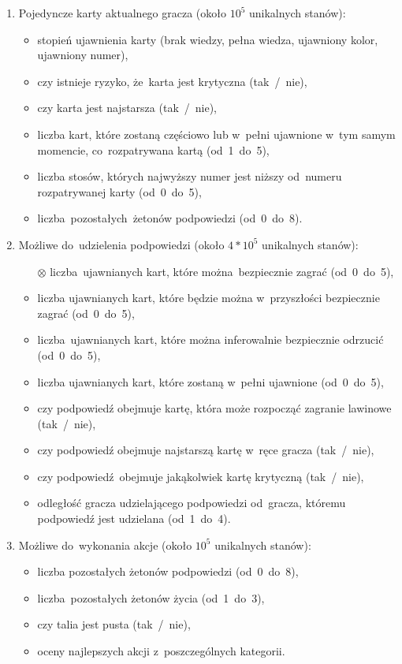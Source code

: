 \documentclass[declaration,shortabstract,inz]{iithesis}
\begin{document}
\begin{enumerate}
	\item Pojedyncze karty aktualnego gracza (około $10^5$ unikalnych stanów):
		\begin{itemize}
			\item stopień ujawnienia karty (brak wiedzy, pełna wiedza, ujawniony kolor, ujawniony numer),
			\item czy istnieje ryzyko, że~karta jest krytyczna (tak~/~nie),
			\item czy karta jest najstarsza (tak~/~nie),
			\item liczba kart, które zostaną częściowo lub w~pełni ujawnione w~tym samym momencie, co~rozpatrywana kartą (od~1~do~5),
			\item liczba stosów, których najwyższy numer jest niższy od~numeru rozpatrywanej karty (od~0~do~5),
			\item liczba pozostałych żetonów podpowiedzi (od~0~do~8).
		\end{itemize}
	\item Możliwe do~udzielenia podpowiedzi (około $4*10^5$ unikalnych stanów):
		\begin{itemize}
			\item[$\otimes$] liczba ujawnianych kart, które można bezpiecznie zagrać (od~0~do~5),
			\item liczba ujawnianych kart, które będzie można w~przyszłości bezpiecznie zagrać (od~0~do~5),
			\item liczba ujawnianych kart, które można inferowalnie bezpiecznie odrzucić (od~0~do~5),
			\item liczba ujawnianych kart, które zostaną w~pełni ujawnione (od~0~do~5),
			\item czy podpowiedź obejmuje kartę, która może rozpocząć zagranie lawinowe (tak~/~nie),
			\item czy podpowiedź obejmuje najstarszą kartę w~ręce gracza (tak~/~nie),
			\item czy podpowiedź obejmuje jakąkolwiek kartę krytyczną (tak~/~nie),
			\item odległość gracza udzielającego podpowiedzi od~gracza, któremu podpowiedź jest udzielana (od~1~do~4).
		\end{itemize}
	\item Możliwe do~wykonania akcje (około $10^5$ unikalnych stanów):
		\begin{itemize}
			\item liczba pozostałych żetonów podpowiedzi (od~0~do~8),
			\item liczba pozostałych żetonów życia (od~1~do~3),
			\item czy talia jest pusta (tak~/~nie),
			\item oceny najlepszych akcji z~poszczególnych kategorii.
		\end{itemize}
\end{enumerate}
\end{document}
